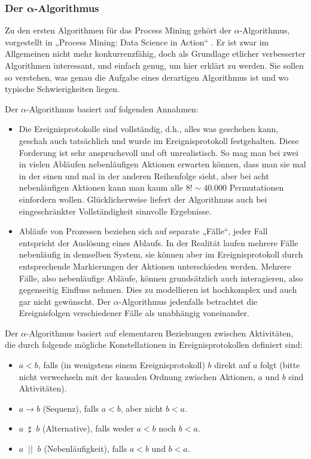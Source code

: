 \subsubsection*{Der $\pmb{\alpha}$-Algorithmus}

Zu den ersten Algorithmen für das Process Mining gehört der $\alpha$-Algorithmus, vorgestellt in „Process Mining: Data Science in Action“ \cite{aal16}. Er ist zwar im Allgemeinen nicht mehr konkurrenzfähig, doch als Grundlage etlicher verbesserter Algorithmen interessant, und einfach genug, um hier erklärt zu werden. Sie sollen so verstehen, was genau die Aufgabe eines derartigen Algorithmus ist und wo typische Schwierigkeiten liegen.

\vspace{\baselineskip} %

Der $\alpha$-Algorithmus basiert auf folgenden Annahmen:
\begin{itemize} 
	\item 
	Die Ereignisprotokolle sind vollständig, d.h., alles was geschehen kann, geschah auch tatsächlich und wurde im Ereignisprotokoll festgehalten. Diese Forderung ist sehr anspruchsvoll und oft unrealistisch. So mag man bei zwei in vielen Abläufen nebenläufigen Aktionen erwarten können, dass man sie mal in der einen und mal in der anderen Reihenfolge sieht, aber bei acht nebenläufigen Aktionen kann man kaum alle $8! \sim 40.000$ Permutationen einfordern wollen. Glücklicherweise liefert der Algorithmus auch bei eingeschränkter Vollständigkeit sinnvolle Ergebnisse.
	\item 
	Abläufe von Prozessen beziehen sich auf separate „Fälle“, jeder Fall entspricht der Auslösung eines Ablaufs. In der Realität laufen mehrere Fälle nebenläufig in demselben System, sie können aber im Ereignisprotokoll durch entsprechende Markierungen der Aktionen unterschieden werden. Mehrere Fälle, also nebenläufige Abläufe, können grundsätzlich auch interagieren, also gegenseitig Einfluss nehmen. Dies zu modellieren ist hochkomplex und auch gar nicht gewünscht. Der $\alpha$-Algorithmus jedenfalls betrachtet die Ereignisfolgen verschiedener Fälle als unabhängig voneinander.
\end{itemize}

Der $\alpha$-Algorithmus basiert auf elementaren Beziehungen zwischen Aktivitäten, die durch folgende mögliche Konstellationen in Ereignisprotokollen definiert sind:
\begin{itemize}
	\item $ a < b$, falls (in wenigstens einem Ereignisprotokoll) $b$ direkt auf $a$ folgt (bitte nicht verwechseln mit der kausalen Ordnung zwischen Aktionen, $a$ und $b$ sind Aktivitäten).
	\item $a \rightarrow b$ (Sequenz), falls $a < b$, aber nicht $b<a$.
	\item $ a \; \;\sharp\;\; b$ (Alternative), falls weder $a < b$ noch $b<a$. 
	\item $a \; \; || \; \; b$ (Nebenläufigkeit), falls $a < b$ und $b<a$. 
\end{itemize}

